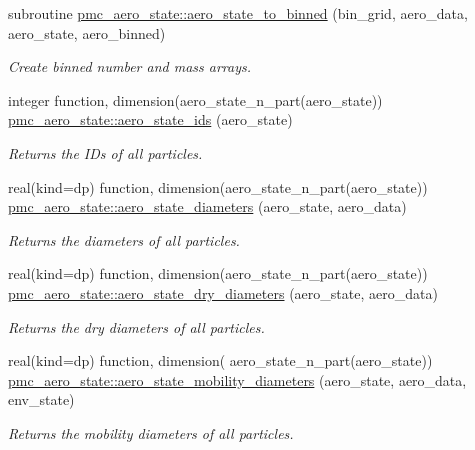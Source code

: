 \begin{DoxyCompactItemize}
subroutine \mbox{\hyperlink{namespacepmc__aero__state_a5535ba7076130a468b1b71a36b64e408}{pmc\+\_\+aero\+\_\+state\+::aero\+\_\+state\+\_\+to\+\_\+binned}} (bin\+\_\+grid, aero\+\_\+data, aero\+\_\+state, aero\+\_\+binned)
\begin{DoxyCompactList}\small\item\em Create binned number and mass arrays. \end{DoxyCompactList}\item 
integer function, dimension(aero\+\_\+state\+\_\+n\+\_\+part(aero\+\_\+state)) \mbox{\hyperlink{namespacepmc__aero__state_a4c0671e83504e6bd71735b876c78ec2f}{pmc\+\_\+aero\+\_\+state\+::aero\+\_\+state\+\_\+ids}} (aero\+\_\+state)
\begin{DoxyCompactList}\small\item\em Returns the I\+Ds of all particles. \end{DoxyCompactList}\item 
real(kind=dp) function, dimension(aero\+\_\+state\+\_\+n\+\_\+part(aero\+\_\+state)) \mbox{\hyperlink{namespacepmc__aero__state_a95c9f58cc1ce505a24fe1cb88eef1918}{pmc\+\_\+aero\+\_\+state\+::aero\+\_\+state\+\_\+diameters}} (aero\+\_\+state, aero\+\_\+data)
\begin{DoxyCompactList}\small\item\em Returns the diameters of all particles. \end{DoxyCompactList}\item 
real(kind=dp) function, dimension(aero\+\_\+state\+\_\+n\+\_\+part(aero\+\_\+state)) \mbox{\hyperlink{namespacepmc__aero__state_a575abf5653d2e972e8eb66a7a30ab187}{pmc\+\_\+aero\+\_\+state\+::aero\+\_\+state\+\_\+dry\+\_\+diameters}} (aero\+\_\+state, aero\+\_\+data)
\begin{DoxyCompactList}\small\item\em Returns the dry diameters of all particles. \end{DoxyCompactList}\item 
real(kind=dp) function, dimension( aero\+\_\+state\+\_\+n\+\_\+part(aero\+\_\+state)) \mbox{\hyperlink{namespacepmc__aero__state_a5ddd78918027552f0815529f4c0128fb}{pmc\+\_\+aero\+\_\+state\+::aero\+\_\+state\+\_\+mobility\+\_\+diameters}} (aero\+\_\+state, aero\+\_\+data, env\+\_\+state)
\begin{DoxyCompactList}\small\item\em Returns the mobility diameters of all particles. \end{DoxyCompactList}\item 

\end{DoxyCompactItemize}
